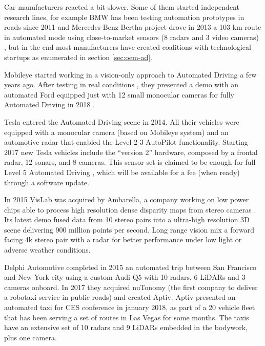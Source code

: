 \documentclass[journal]{IEEEtran}
\begin{document}
Car manufacturers reacted a bit slower. 
Some of them started independent research lines, for example
BMW has been testing automation prototypes in roads since 2011 
\cite{Aeberhard2015a} and Mercedes-Benz Bertha project \cite{Ziegler2014}
drove in 2013 a 103 km route in automated
mode using close-to-market sensors (8 radars and 3 video cameras)
, but in the end most manufacturers have created coalitions with technological
startups as enumerated in section \ref{sec:oem-ad}.


Mobileye started working in a vision-only approach to Automated Driving a few years ago. 
After testing in real conditions \cite{Edelstein2018}, they presented a demo 
with an automated Ford equipped just with 12 small monocular cameras for fully 
Automated Driving in 2018 \cite{Scheer2018}.

Tesla entered the Automated Driving scene in 2014.
All their vehicles were equipped with a monocular camera (based on 
Mobileye system) and an automotive radar that enabled the Level 2-3 AutoPilot
functionality. 
Starting 2017 new Tesla vehicles include the ``version 2'' hardware, 
composed by a frontal radar, 12 sonars, and 8 cameras.
This sensor set is claimed to be enough for full Level 5 Automated Driving
\cite{Hawkins2017}, which will be available for a fee (when ready) through a
software update.

In 2015 VisLab was acquired by Ambarella, a company working on low power chips
able to process high resolution dense disparity maps from stereo cameras
\cite{Ambarella2018}. 
Its latest demo \cite{AUVSI2018} fused data from 10 stereo pairs into a
ultra-high resolution 3D scene delivering 900 million points per second.
Long range vision mix a forward facing 4k stereo pair with a radar for better
performance under low light or adverse weather conditions. 

Delphi Automotive completed in 2015 an automated trip between San Francisco and
New York city using a custom Audi Q5 with 10 radars, 6 LiDARs and 3 cameras 
onboard. In 2017 they acquired nuTonomy (the first company to deliver a 
robotaxi service in public roads) and created Aptiv. 
Aptiv presented an automated taxi for CES conference in january 2018, as part
of a 20 vehicle fleet that has been serving a set of routes in Las Vegas for
some months. The taxis have an extensive set of 10 radars and 9 LiDARs embedded 
in the bodywork, plus one camera.
\end{document}
